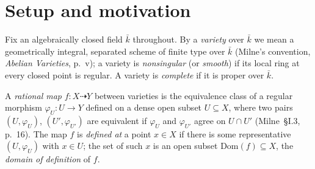 \section{Setup and motivation}
\label{sec:codim1_setup}

Fix an algebraically closed field \(\bar k\) throughout. By a \emph{variety} over \(\bar k\)
we mean a geometrically integral, separated scheme of finite type over \(\bar k\)
(Milne's convention, \emph{Abelian Varieties}, p.~v); a variety is \emph{nonsingular}
(or \emph{smooth}) if its local ring at every closed point is regular. A variety is
\emph{complete} if it is proper over \(\bar k\).

A \emph{rational map} \(f \colon X \dashrightarrow Y\) between varieties is the equivalence
class of a regular morphism \(\varphi_U \colon U \to Y\) defined on a dense open subset
\(U \subseteq X\), where two pairs \((U, \varphi_U)\), \((U', \varphi_{U'})\) are equivalent
if \(\varphi_U\) and \(\varphi_{U'}\) agree on \(U \cap U'\) (Milne~\S I.3, p.~16). The map \(f\)
is \emph{defined at} a point \(x \in X\) if there is some representative \((U, \varphi_U)\)
with \(x \in U\); the set of such \(x\) is an open subset \(\mathrm{Dom}(f) \subseteq X\),
the \emph{domain of definition} of \(f\).

